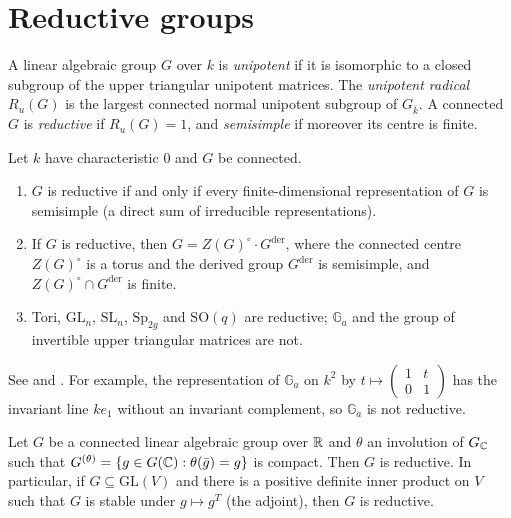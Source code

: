 \section{Reductive groups}\label{algebraic-groups:section-reductive}

\begin{definition}\label{algebraic-groups:definition-reductive}
A linear algebraic group $G$ over $k$ is \emph{unipotent} if it is isomorphic to a closed subgroup of the upper triangular unipotent matrices. The \emph{unipotent radical}
$R_u(G)$ is the largest connected normal unipotent subgroup of $G_{\bar k}$. A connected $G$ is \emph{reductive} if $R_u(G) = 1$, and \emph{semisimple} if moreover its centre is finite.
\end{definition}

\begin{theorem}\label{algebraic-groups:theorem-reductive}
Let $k$ have characteristic $0$ and $G$ be connected.
\begin{enumerate}
\item $G$ is reductive if and only if every finite-dimensional representation of $G$ is semisimple (a direct sum of irreducible representations).
\item If $G$ is reductive, then $G = Z(G)^\circ \cdot G^{\mathrm{der}}$, where the connected centre $Z(G)^\circ$ is a torus and the derived group $G^{\mathrm{der}}$ is semisimple, and
$Z(G)^\circ \cap G^{\mathrm{der}}$ is finite.
\item Tori, $\mathrm{GL}_n$, $\mathrm{SL}_n$, $\mathrm{Sp}_{2g}$ and $\mathrm{SO}(q)$ are reductive; $\mathbb{G}_a$ and the group of invertible upper triangular matrices are not.
\end{enumerate}
\end{theorem}

See \cite{milne-algebraic-groups} and \cite{borel-lag}. For example, the representation of $\mathbb{G}_a$ on $k^2$ by
$t \mapsto \left(\begin{smallmatrix}1 & t \\ 0 & 1\end{smallmatrix}\right)$ has the invariant line $k e_1$ without an invariant complement, so $\mathbb{G}_a$ is not reductive.

\begin{proposition}\label{algebraic-groups:proposition-cartan-involution}
Let $G$ be a connected linear algebraic group over $\mathbb{R}$ and $\theta$ an involution of $G_{\mathbb{C}}$ such that
$G^{(\theta)} = \{g \in G(\mathbb{C}) : \theta(\bar g) = g\}$ is compact. Then $G$ is reductive. In particular, if $G \subseteq \mathrm{GL}(V)$ and there is a positive definite inner
product on $V$ such that $G$ is stable under $g \mapsto g^T$ (the adjoint), then $G$ is reductive.
\end{proposition}

